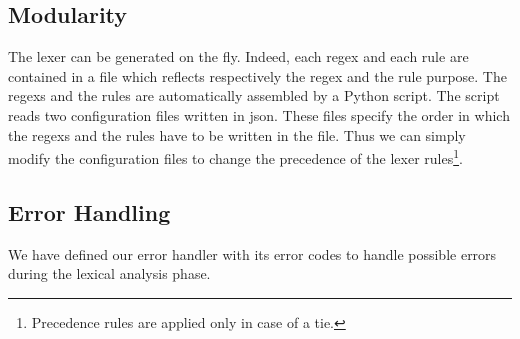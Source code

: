 \subsection{Modularity}
The lexer can be generated on the fly. Indeed, each regex and each rule are
contained in a file which reflects respectively the regex and the rule purpose.
The regexs and the rules are automatically assembled by a Python script.
The script reads two configuration files written in json. These files specify
the order in which the regexs and the rules have to be written in the
 file. Thus we can simply modify the configuration files to 
change the precedence of the lexer rules\footnote{Precedence rules are 
applied only in case of a tie.}.

\subsection{Error Handling}
We have defined our error handler with its error codes to handle possible errors
during the lexical analysis phase.
